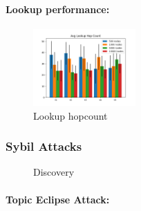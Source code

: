 \paragraph{\bf{Lookup performance}:}

\begin{figure}[h!]
\centering
\includegraphics[width=0.35\textwidth]{img/eval/lookup_hopcount.png}
\caption{Lookup hopcount}
\label{fig:hopcount}
\vspace{-0.15in}
\end{figure}

\subsubsection{Sybil Attacks}


\begin{figure}[!h]
\centering
{} 
\hspace{-0.25cm}
 \caption{Discovery} 
\label{fig:discovery}
\vspace{-0.15in}
\end{figure}   


\paragraph{\bf{Topic Eclipse Attack:}}

